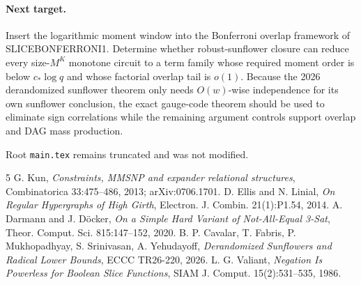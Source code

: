 \documentclass[11pt]{article}
\begin{document}
\paragraph{Next target.}
Insert the logarithmic moment window into the Bonferroni overlap framework of SLICEBONFERRONI1. Determine whether robust-sunflower closure can reduce every size-$M^K$ monotone circuit to a term family whose required moment order is below $c_*\log q$ and whose factorial overlap tail is $o(1)$. Because the 2026 derandomized sunflower theorem only needs $O(w)$-wise independence for its own sunflower conclusion, the exact gauge-code theorem should be used to eliminate sign correlations while the remaining argument controls support overlap and DAG mass production.

Root \texttt{main.tex} remains truncated and was not modified.

\begin{thebibliography}{5}
 G. Kun, \emph{Constraints, MMSNP and expander relational structures}, Combinatorica 33:475--486, 2013; arXiv:0706.1701.
 D. Ellis and N. Linial, \emph{On Regular Hypergraphs of High Girth}, Electron. J. Combin. 21(1):P1.54, 2014.
 A. Darmann and J. D\"ocker, \emph{On a Simple Hard Variant of Not-All-Equal 3-Sat}, Theor. Comput. Sci. 815:147--152, 2020.
 B. P. Cavalar, T. Fabris, P. Mukhopadhyay, S. Srinivasan, A. Yehudayoff, \emph{Derandomized Sunflowers and Radical Lower Bounds}, ECCC TR26-220, 2026.
 L. G. Valiant, \emph{Negation Is Powerless for Boolean Slice Functions}, SIAM J. Comput. 15(2):531--535, 1986.
\end{thebibliography}
\end{document}
